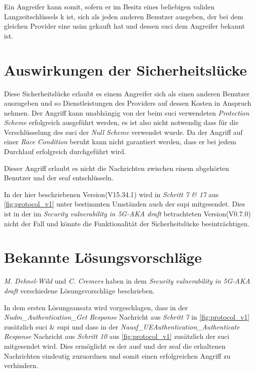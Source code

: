 Ein Angreifer kann somit, sofern er im Besitz eines beliebigen validen Langzeitschlüssels \gls{k} ist, sich als jeden anderen Benutzer ausgeben, der bei dem gleichen Provider eine \gls{usim} gekauft hat und dessen \gls{suci} dem Angreifer bekannt ist.


\section{Auswirkungen der Sicherheitslücke}

Diese Sicherheitslücke erlaubt es einem Angreifer sich als einen anderen Benutzer auszugeben und so Dienstleistungen des Providers auf dessen Kosten in Anspruch nehmen.
Der Angriff kann unabhängig von der beim \gls{suci} verwendeten \textit{Protection Scheme} erfolgreich ausgeführt werden, es ist also nicht notwendig dass für die Verschlüsselung des \gls{suci} der \textit{Null Scheme} verwendet wurde.
Da der Angriff auf einer \textit{Race Condition} beruht kann nicht garantiert werden, dass er bei jedem Durchlauf erfolgreich durchgeführt wird.

Dieser Angriff erlaubt es nicht die Nachrichten zwischen einem abgehörten Benutzer und der \gls{seaf} entschlüsseln.

In der hier beschriebenen Version(V15.34.1) wird in \textit{Schritt 7 \& 17} aus \cref{fig:protocol_v1} unter bestimmten Umständen auch der \gls{supi} mitgesendet.
Dies ist in der im \textit{Security vulnerability in 5G-AKA draft} betrachteten Version(V0.7.0) nicht der Fall und könnte die Funktionalität der Sicherheitslücke beeinträchtigen.


\section{Bekannte Lösungsvorschläge}

\textit{M. Dehnel-Wild} und \textit{C. Cremers} haben in dem \textit{Security vulnerability in 5G-AKA draft} verschiedene Lösungsvorschläge beschrieben.

In dem ersten Lösungsansatz wird vorgeschlagen, dass in der \textit{Nudm\_Authentication\_Get Response} Nachricht aus \textit{Schritt 7} in \cref{fig:protocol_v1} zusätzlich \gls{suci} \& \gls{supi} und dass in der \textit{Nausf\_UEAuthentication\_Authenticate Response} Nachricht aus \textit{Schritt 10} aus \cref{fig:protocol_v1} zusätzlich der \gls{suci} mitgesendet wird.
Dies ermöglicht es der \gls{ausf} und der \gls{seaf} die erhaltenen Nachrichten eindeutig zuzuordnen und somit einen erfolgreichen Angriff zu verhindern.


